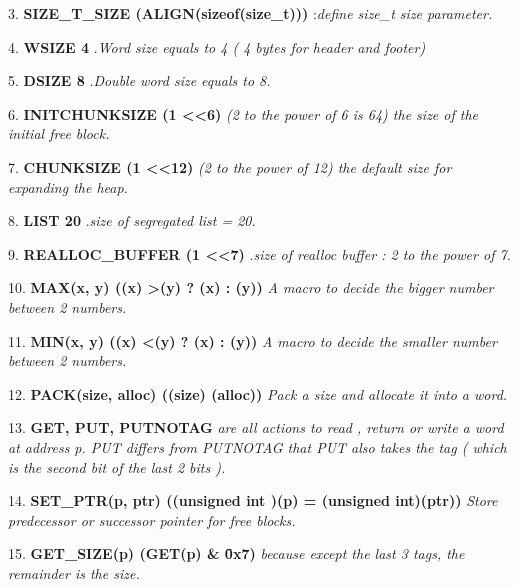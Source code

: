 \documentclass[a4paper]{article}
\begin{document}
3. {\bf SIZE\_T\_SIZE (ALIGN(sizeof(size\_t)))} :{\it define size\_t size parameter.}
\newline  

4. {\bf WSIZE 4 }.{\it Word size equals to 4 ( 4 bytes for header and footer) }
\newline  

5. {\bf DSIZE 8 }.{\it Double word size equals to 8.}
\newline  

6. {\bf INITCHUNKSIZE (1 \textless  \textless 6)} {\it (2 to the power of 6 is 64) the size of the initial free block.} 
\newline  

7. {\bf CHUNKSIZE (1 \textless  \textless 12) } {\it (2 to the power of 12) the default size for expanding the heap. }
\newline  

8. {\bf LIST 20} .{\it size of segregated list = 20.}
\newline  

9. {\bf  REALLOC\_BUFFER  (1  \textless  \textless 7) } .{\it size of realloc buffer : 2 to the power of 7. }
\newline  

10. {\bf MAX(x, y) ((x)  \textgreater (y) ? (x) : (y)) } {\it A macro to decide the bigger number between 2 numbers. }
\newline  

11. {\bf MIN(x, y) ((x)  \textless (y) ? (x) : (y))} {\it  A macro to decide the smaller number between 2 numbers.}
\newline  

12. {\bf PACK(size, alloc) ((size) \textbar (alloc))} {\it Pack a size and allocate it into a word. }
\newline  

13. {\bf GET, PUT, PUTNOTAG } {\it are all actions to read , return or write a word at address p. PUT differs from PUTNOTAG that PUT also takes the tag ( which is the second bit of the last 2 bits ).  
\newline  }

14. {\bf  SET\_PTR(p, ptr) (\*(unsigned int \*)(p) = (unsigned int)(ptr)) } {\it  Store predecessor or successor pointer for free blocks.}
\newline  

15. {\bf GET\_SIZE(p)  (GET(p) \& \~ 0x7) } {\it because except the last 3 tags, the remainder is the size. }
\newline  
\end{document}
